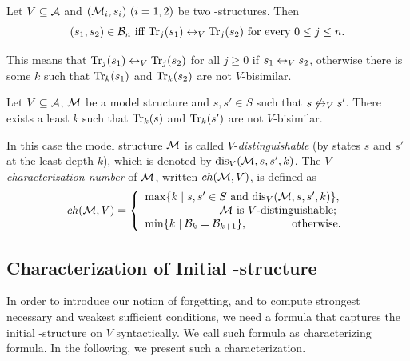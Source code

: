 \documentclass{article}
\begin{document}
\begin{proposition}\label{B_to_T}
  Let $V\subseteq\cal A$ and $({\cal M}_i,s_i)~(i=1,2)$ be two \MPK-structures.
  Then
  \[(s_1,s_2)\in{\cal B}_n\mbox{ iff }
  \textrm{Tr}_j(s_1)\leftrightarrow_V\textrm{Tr}_j(s_2)\mbox{ for every $0\le j\le n$}.\]
\end{proposition}
This means that $\textrm{Tr}_j(s_1) \leftrightarrow_V \textrm{Tr}_j(s_2)$ for all $j \geq 0$ if $s_1 \leftrightarrow_V s_2$, otherwise there is some $k$ such that $\textrm{Tr}_k(s_1)$ and $\textrm{Tr}_k(s_2)$ are not $V$-bisimilar.

\begin{proposition}\label{pro:k}
  Let $V\subseteq {\cal A}$, ${\cal M}$ be a model structure and $s,s'\in S$
  such that $s\not\leftrightarrow_V s'$.
  There exists a least  $k$ such that
  $\textrm{Tr}_k(s)$ and $\textrm{Tr}_k(s')$ are not $V$-bisimilar.
\end{proposition}
In this case the  model structure ${\cal M}$ is called $V$-{\em distinguishable} (by
states $s$ and $s'$ at the least depth $k$), which is denoted by $\textrm{dis}_V({\cal M},s,s',k)$.
The $V$-{\em characterization number}
of ${\cal M}$, written $ch({\cal M},V)$, is defined as
\[ch({\cal M},V)=
\left\{
  \begin{array}{ll}
    \max\{k\mid s,s'\in S \text{ and }\textrm{dis}_V({\cal M},s,s',k)\},\\
         \ \ \qquad \qquad \qquad \hbox{${\cal M}$ is $V$-distinguishable;} \\
    \min\{k\mid {\cal B}_{k}={\cal B}_{k+1}\}, \ \ \ \quad \qquad \hbox{otherwise.}
  \end{array}
\right.
\]




\subsection{Characterization of Initial \MPK-structure}

In order to introduce our notion of forgetting, and to compute strongest necessary and weakest sufficient conditions, we need a formula that captures the  initial \MPK-structure on $V$ syntactically. We call such formula as characterizing formula.
In the following, we present such a characterization.
\end{document}
